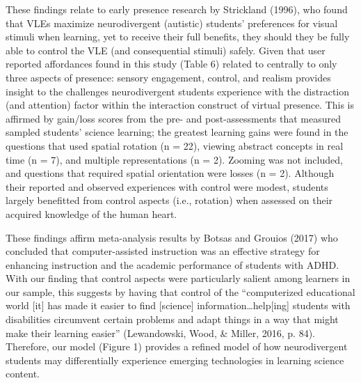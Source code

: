 \documentclass[11.5pt]{sig-alternate} %
\begin{document}
\begin{large}
These findings relate to early presence research by Strickland (1996), who found that VLEs maximize neurodivergent (autistic) students’ preferences for visual stimuli when learning, yet to receive their full benefits, they should they be fully able to control the VLE (and consequential stimuli) safely. Given that user reported affordances found in this study (Table 6) related to centrally to only three aspects of presence: sensory engagement, control, and realism provides insight to the challenges neurodivergent students experience with the distraction (and attention) factor within the interaction construct of virtual presence. This is affirmed by gain/loss scores from the pre- and post-assessments that measured sampled students’ science learning; the greatest learning gains were found in the questions that used spatial rotation (n = 22), viewing abstract concepts in real time (n = 7), and multiple representations (n = 2). Zooming was not included, and questions that required spatial orientation were losses (n = 2). Although their reported and observed experiences with control were modest, students largely benefitted from control aspects (i.e., rotation) when assessed on their acquired knowledge of the human heart. 

These findings affirm meta-analysis results by Botsas and Grouios (2017) who concluded that computer-assisted instruction was an effective strategy for enhancing instruction and the academic performance of students with ADHD. With our finding that control aspects were particularly salient among learners in our sample, this suggests by having that control of the “computerized educational world [it] has made it easier to find [science] information…help[ing] students with disabilities circumvent certain problems and adapt things in a way that might make their learning easier” (Lewandowski, Wood, \& Miller, 2016, p. 84). Therefore, our model (Figure 1) provides a refined model of how neurodivergent students may differentially experience emerging technologies in learning science content.  


\end{large}
\end{document}
